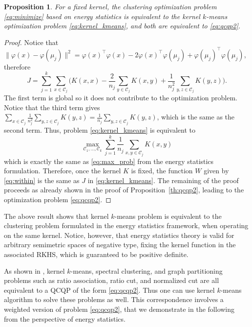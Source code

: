 \documentclass[aps,preprint,nofootinbib,floatfix]{revtex4-1}
\newtheorem{proposition}[theorem]{Proposition}
\newcommand\kk{K}
\newcommand\C{{\mathcal{C}}}
\begin{document}
\begin{proposition}
\label{th:kernel_kmeans}
For a fixed kernel,
the clustering optimization problem
\eqref{eq:minimize} based on energy statistics 
is equivalent to the kernel $k$-means optimization problem
\eqref{eq:kernel_kmeans}, and both are equivalent to \eqref{eq:qcqp2}.
\end{proposition}
\begin{proof}
Notice that $\| \varphi(x) - \varphi(\mu_j) \|^2 = \varphi(x)^\top \varphi(x)
- 2 \varphi(x)^\top \varphi(\mu_j) + \varphi(\mu_j)^\top \varphi(\mu_j)$,
therefore
\begin{equation}
\label{eq:J}
J = \sum_{j=1}^k \sum_{x\in\C_j} \bigg(
\kk(x,x) - 
\dfrac{2}{n_j} \sum_{y\in \C_j} \kk(x,y) + \dfrac{1}{n_j^2}
\sum_{y,z \in \C_j} \kk(y,z) \bigg).
\end{equation}
The first term is global so it does not contribute to the optimization
problem. Notice that the third term gives
$\sum_{x\in\C_j} \tfrac{1}{n_j^2} \sum_{y,z\in\C_j} \kk(y,z) =
\tfrac{1}{n_j}\sum_{y,z\in\C_j} \kk(y,z)$, which is the same as
the second term. Thus, problem
\eqref{eq:kernel_kmeans} is equivalent to
\begin{equation}
\max_{\C_1,\dotsc,\C_k}
\sum_{j=1}^k \dfrac{1}{n_j} \sum_{x,y \in\C_j} \kk(x,y) 
\end{equation}
which is exactly the same as 
\eqref{eq:max_prob} from the energy statistics formulation. Therefore,
once the kernel $\kk$ is fixed, the function 
$W$ given by \eqref{eq:within} is the same
as $J$ in \eqref{eq:kernel_kmeans}.
The remaining of the proof proceeds as 
already shown in the proof of Proposition~\ref{th:qcqp2}, leading to
the optimization problem \eqref{eq:qcqp2}.
\end{proof}

The above result shows that 
kernel $k$-means problem is equivalent to the clustering problem
formulated in the energy statistics framework, when operating on the same
kernel. Notice, however, that 
energy statistics theory is valid for arbitrary semimetric spaces of
negative type, fixing the kernel function in the associated RKHS, which
is guaranteed to be positive definite.

As shown in \cite{Dhillon2,Dhillon}, kernel $k$-means, spectral clustering,
and graph partitioning problems such as ratio association, ratio cut, and
normalized cut are all equivalent to a QCQP of the form \eqref{eq:qcqp2}. Thus
one can use kernel $k$-means algorithm to solve these problems as well.
This correspondence involves a weighted version of problem 
\eqref{eq:qcqp2}, that
we demonstrate in the following from the perspective of energy statistics.
\end{document}
